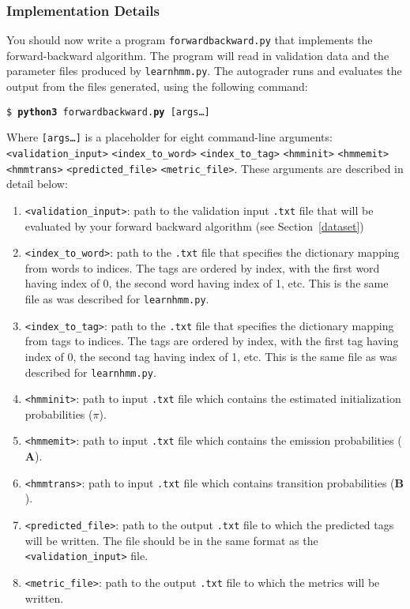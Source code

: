\documentclass[11pt,addpoints,answers]{exam}
\begin{document}
\clearpage
\subsubsection{Implementation Details}

You should now write a program \texttt{forwardbackward.py} that implements the forward-backward algorithm. The program will read in validation data and the parameter files produced by \texttt{learnhmm.py}. The autograder runs and evaluates the output from the files generated, using the following command:

\begin{tabbing}
\=\texttt{\$ \textbf{python3} forwardbackward.\textbf{py} [args\dots]}\\
\end{tabbing}

Where \texttt{[args\dots]} is a placeholder for eight command-line arguments:\texttt{<validation\_input>} \texttt{<index\_to\_word>} \texttt{<index\_to\_tag>} \texttt{<hmminit>} \texttt{<hmmemit>} \texttt{<hmmtrans>} \texttt{<predicted\_file>} \texttt{<metric\_file>}. These arguments are described in detail below:
\begin{enumerate}
    \item \texttt{<validation\_input>}: path to the validation input \texttt{.txt} file that will be evaluated by your forward backward algorithm (see Section~\ref{dataset})
    \item \texttt{<index\_to\_word>}: path to the \texttt{.txt} file that specifies the dictionary mapping from words to indices. The tags are ordered by index, with the first word having index of 0, the second word having index of 1, etc. This is the same file as was described for \texttt{learnhmm.py}.
    \item \texttt{<index\_to\_tag>}: path to the \texttt{.txt} file that specifies the dictionary mapping from tags to indices. The tags are ordered by index, with the first tag having index of 0, the second tag having index of 1, etc. This is the same file as was described for \texttt{learnhmm.py}.
    \item \texttt{<hmminit>}: path to input \texttt{.txt} file which contains the estimated initialization probabilities (\boldmath${\pi}$).
    \item \texttt{<hmmemit>}: path to input \texttt{.txt} file which contains the emission probabilities ($\mathbf A$).
    \item \texttt{<hmmtrans>}: path to input \texttt{.txt} file which contains transition probabilities ($\mathbf B$).
    \item \texttt{<predicted\_file>}: path to the output \texttt{.txt} file to which the predicted tags will be written. The file should be in the same format as the \texttt{<validation\_input>} file. 
    \item \texttt{<metric\_file>}: path to the output \texttt{.txt} file to which the metrics will be written. 
\end{enumerate}
\end{document}
